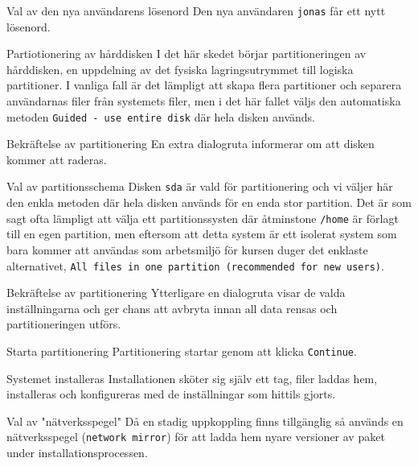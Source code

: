            {Val av den nya användarens lösenord}
           {Den nya användaren \texttt{jonas} får ett nytt lösenord.}
           {}

           {Partiotionering av hårddisken}
           {I det här skedet börjar partitioneringen av hårddisken, en
            uppdelning av det fysiska lagringsutrymmet till logiska
            partitioner. I vanliga fall är det lämpligt att skapa flera
            partitioner och separera användarnas filer från systemets filer,
            men i det här fallet väljs den automatiska metoden
            \texttt{Guided - use entire disk} där hela disken används.}
           {}

           {Bekräftelse av partitionering}
           {En extra dialogruta informerar om att disken kommer att raderas.}
           {}

           {Val av partitionsschema}
           {Disken \texttt{sda} är vald för partitionering och vi väljer här
            den enkla metoden där hela disken används för en enda stor partition.
            Det är som sagt ofta lämpligt att välja ett partitionssysten där
            åtminstone \texttt{/home} är förlagt till en egen partition, men
            eftersom att detta system är ett isolerat system som bara kommer
            att användas som arbetsmiljö för kursen duger det enklaste alternativet,
            \texttt{All files in one partition (recommended for new users)}.
            }
           {}

           {Bekräftelse av partitionering}
           {Ytterligare en dialogruta visar de valda inställningarna och ger
            chans att avbryta innan all data rensas och partitioneringen utförs.}
           {}

           {Starta partitionering}
           {Partitionering startar genom att klicka \texttt{Continue}.}
           {}

           {Systemet installeras}
           {Installationen sköter sig själv ett tag, filer laddas hem, installeras
            och konfigureras med de inställningar som hittils gjorts.}
           {}

           {Val av "nätverksspegel"}
           {Då en stadig uppkoppling finns tillgänglig så används en
            nätverksspegel (\texttt{network mirror}) för att ladda hem nyare
            versioner av paket under installationsprocessen.}
           {}


